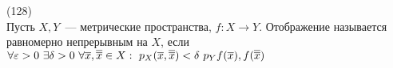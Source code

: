 (128)\\
Пусть $X, Y$~--- метрические пространства, $f: X \to Y$. Отображение называется равномерно непрерывным на $X$, если\\
$\forall \varepsilon > 0\ \exists \delta > 0\ \forall \overline{x}, \overline{\overline{x}} \in X:\ p_X(\overline{x}, \overline{\overline{x}}) < \delta\ p_Y{f(\overline{x}), f(\overline{\overline{x}})}$